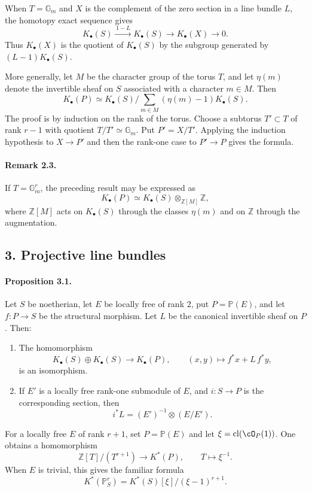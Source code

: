 \documentclass[11pt]{article}
\theoremstyle{plain}
\theoremstyle{definition}
\theoremstyle{remark}
\newcommand{\bP}{\mathbb P}
\newcommand{\GG}{\mathbb G}
\newcommand{\ZZ}{\mathbb Z}
\DeclareMathOperator{\cl}{cl}
\newcommand{\longto}{\longrightarrow}
\providecommand{\xto}[1]{\xrightarrow{#1}}
\begin{document}
When $T=\GG_m$ and $X$ is the complement of the zero section in a line bundle $L$, the homotopy exact sequence gives
\[
K_\bullet(S)\xto{\,1-L\,}K_\bullet(S)\longto K_\bullet(X)\longto0.
\]
Thus $K_\bullet(X)$ is the quotient of $K_\bullet(S)$ by the subgroup generated by $(L-1)K_\bullet(S)$.

More generally, let $M$ be the character group of the torus $T$, and let $\eta(m)$ denote the invertible sheaf on $S$ associated with a character $m\in M$. Then
\[
K_\bullet(P)\simeq K_\bullet(S)\Big/\sum_{m\in M}(\eta(m)-1)K_\bullet(S).
\]
The proof is by induction on the rank of the torus. Choose a subtorus $T'\subset T$ of rank $r-1$ with quotient $T/T'\simeq\GG_m$. Put $P'=X/T'$. Applying the induction hypothesis to $X\to P'$ and then the rank-one case to $P'\to P$ gives the formula.

\paragraph{Remark 2.3.}
If $T=\GG_m^r$, the preceding result may be expressed as
\[
K_\bullet(P)\simeq K_\bullet(S)\otimes_{\ZZ[M]}\ZZ,
\]
where $\ZZ[M]$ acts on $K_\bullet(S)$ through the classes $\eta(m)$ and on $\ZZ$ through the augmentation.

\subsection*{3. Projective line bundles}

\paragraph{Proposition 3.1.}
Let $S$ be noetherian, let $E$ be locally free of rank $2$, put $P=\bP(E)$, and let $f:P\to S$ be the structural morphism. Let $L$ be the canonical invertible sheaf on $P$. Then:
\begin{enumerate}[label=\roman*)]
\item The homomorphism
\[
K_\bullet(S)\oplus K_\bullet(S)\longto K_\bullet(P),\qquad
(x,y)\longmapsto f^*x+L\,f^*y,
\]
is an isomorphism.
\item If $E'$ is a locally free rank-one submodule of $E$, and $i:S\to P$ is the corresponding section, then
\[
i^*L=(E')^{-1}\otimes(E/E').
\]
\end{enumerate}

For a locally free $E$ of rank $r+1$, set $P=\bP(E)$ and let $\xi=\cl(\cO_P(1))$. One obtains a homomorphism
\[
\ZZ[T]/(T^{r+1})\longto K^*(P),\qquad T\longmapsto \xi^{-1}.
\]
When $E$ is trivial, this gives the familiar formula
\[
K^*(\bP^r_S)=K^*(S)[\xi]/(\xi-1)^{r+1}.
\]
\end{document}
